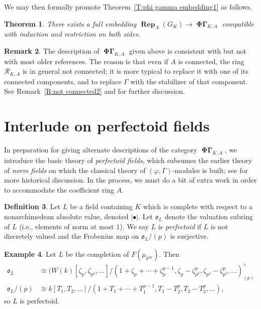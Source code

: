 \documentclass[12pt]{amsart}
\newtheorem{theorem}{Theorem}[section]
\theoremstyle{definition}
\newtheorem{defn}[theorem]{Definition}
\newtheorem{example}[theorem]{Example}
\newtheorem{remark}[theorem]{Remark}
\numberwithin{equation}{theorem}
\newcommand{\calR}{\mathcal{R}}
\newcommand{\frako}{\mathfrak{o}}
\DeclareMathOperator{\PhiGamma}{\mathbf{\Phi \Gamma}}
\DeclareMathOperator{\Rep}{\mathbf{Rep}}
\begin{document}
We may then formally promote Theorem~\ref{T:phi gamma embedding1} as follows.
\begin{theorem} \label{T:phi gamma embedding}
There exists a full embedding $\Rep_A(G_K) \to \PhiGamma_{K,A}$ compatible with induction and restriction on both sides.
\end{theorem}

\begin{remark} \label{R:not connected}
The description of $\PhiGamma_{K,A}$ given above is consistent with \cite{kedlaya-new-phigamma} but not with most older references. The reason is that even if $A$ is connected, the ring $\calR_{K,A}$ is in general not connected; it is more typical to replace it with one of its connected components, and to replace $\Gamma$ with the stabilizer of that component.
See Remark~\ref{R:not connected2} and \cite[Remark~2.2.12]{kedlaya-new-phigamma} for further discussion.
\end{remark}

\section{Interlude on perfectoid fields}
\label{sec:perfectoid}

In preparation for giving alternate descriptions of the category $\PhiGamma_{K,A}$, we introduce the basic theory of \emph{perfectoid fields}, which subsumes the earlier theory of \emph{norm fields} on which the classical theory of $(\varphi, \Gamma)$-modules is built; see \cite{kedlaya-new-phigamma} for more historical discussion. In the process, we must do a bit of extra work in order to accommodate the coefficient ring $A$.

\begin{defn}
Let $L$ be a field containing $K$ which is complete with respect to a nonarchimedean absolute value, denoted $\left| \bullet \right|$. Let $\frako_L$ denote the valuation subring of $L$ (i.e., elements of norm at most $1$). We say $L$ is \emph{perfectoid} if $L$ is not discretely valued and the Frobenius map on $\frako_L/(p)$ is surjective.
\end{defn}

\begin{example}  \label{exa:cyclotomic}
Let $L$ be the completion of $F(\mu_{p^\infty})$.
Then 
\begin{align*}
\frako_L &\cong (W(k)[\zeta_p, \zeta_{p^2}, \dots]/(1 + \zeta_p + \cdots + \zeta_p^{p-1}, \zeta_p - \zeta_{p^2}^p, \zeta_{p^2} - \zeta_{p^3}^p, \dots)^{\wedge}_{(p)} \\
\frako_L/(p) &\cong k[T_1, T_2, \dots]/(1+T_1 + \cdots + T_1^{p-1}, T_1 - T_2^p, T_2 - T_3^p, \dots),
\end{align*}
so $L$ is perfectoid.
\end{example}
\end{document}

